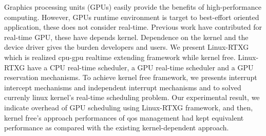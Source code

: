 Graphics processing units (GPUs) easily provide the benefits of high-performance computing.
However, GPUs runtime environment is target to best-effort oriented application, these does not consider real-time.
Previous work have contributed for real-time GPU, these have depends kernel.
Dependence on the kernel and the device driver gives the burden developers and users.
We present Linux-RTXG which is realized cpu-gpu realtime extending framework while kernel free.
Linux-RTXG have a CPU real-time scheduler, a GPU real-time scheduler and a GPU reservation mechanisms.
To achieve kernel free framework, 
we presents interrupt intercept mechanisms and independent interrupt mechanisms and to solved currenly linux kernel's real-time scheduling problem.
Our experimental result,
we indicate overhead of GPU scheduling using Linux-RTXG framework,
and then, kernel free's approach performances of qos management had kept equivalent performance as compared with the existing kernel-dependent approach.
